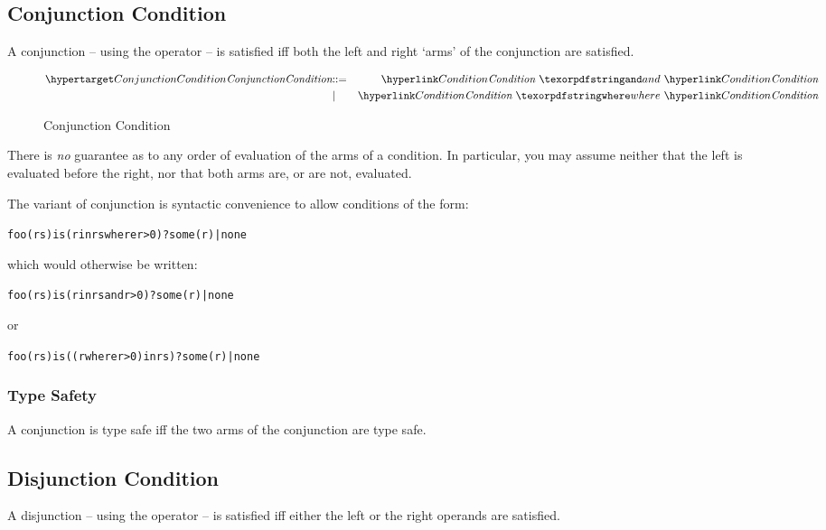 \subsection{Conjunction Condition}
A conjunction -- using the  operator -- is satisfied iff both the left and right `arms' of the conjunction are satisfied.

\begin{figure}[htbp]
\begin{eqnarray*}
\ntDef{ConjunctionCondition}&\arrow&\ntRef{Condition}\ \q{and}\ \ntRef{Condition}\\
&\choice&\ntRef{Condition}\ \q{where}\ \ntRef{Condition}\\
\end{eqnarray*}
\caption{Conjunction Condition}
\label{conjunctionConditionFormFig}
\end{figure}

\begin{aside}
There is \emph{no} guarantee as to any order of evaluation of the arms of a condition. In particular, you may assume neither that the left is evaluated before the right, nor that both arms are, or are not, evaluated.
\end{aside}

\begin{aside}
The  variant of conjunction is syntactic convenience to allow conditions of the form:
\begin{alltt}
foo(rs) is (r in rs where r > 0) ? some(r) | none
\end{alltt}
which would otherwise be written:
\begin{alltt}
foo(rs) is (r in rs and r > 0) ? some(r) | none
\end{alltt}
or
\begin{alltt}
foo(rs) is ((r where r > 0) in rs) ? some(r) | none
\end{alltt}
\end{aside}

\subsubsection{Type Safety}
A conjunction is type safe iff the two arms of the conjunction are type safe.
\begin{prooftree}
\end{prooftree}

\subsection{Disjunction Condition}
A disjunction -- using the  operator -- is satisfied iff either the left or the right operands are satisfied.

